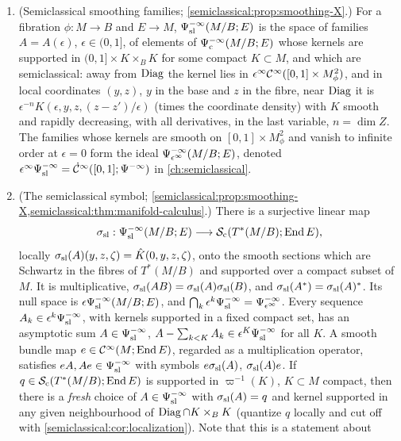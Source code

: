 \begin{enumerate}[label=(S\arabic*),leftmargin=*]
\item\label{scindex:S-smoothing} (Semiclassical smoothing families;
  \cref{semiclassical:prop:smoothing-X}.) For a fibration $\phi:M\to B$ and
  $E\to M$, $\Psi^{-\infty}_{\mathrm{sl}}(M/B;E)$ is the space of families $A=A(\epsilon)$,
  $\epsilon\in(0,1]$, of elements of $\Psi^{-\infty}_{\mathrm c}(M/B;E)$ whose
  kernels are supported in $(0,1]\times K\times_BK$ for some compact
  $K\subset M$, and which are semiclassical: away from $\operatorname{Diag}$ the kernel lies in
  $\epsilon^\infty\mathcal{C}^\infty([0,1]\times M^2_\phi)$, and in local coordinates $(y,z)$,
  $y$ in the base and $z$ in the fibre, near $\operatorname{Diag}$ it is
  $\epsilon^{-n}K(\epsilon,y,z,(z-z')/\epsilon)$ (times the coordinate density)
  with $K$ smooth and rapidly decreasing, with all derivatives, in the last
  variable, $n=\dim Z$. The families whose kernels are smooth on
  $[0,1]\times M^2_\phi$ and vanish to infinite order at $\epsilon=0$ form the
  ideal $\Psi^{-\infty}_{\epsilon^\infty}(M/B;E)$, denoted $\epsilon^\infty\Psi^{-\infty}_{\mathrm{sl}}=
  \dot{\mathcal{C}}^\infty([0,1];\Psi^{-\infty})$ in \cref{ch:semiclassical}.
\item\label{scindex:S-symbol} (The semiclassical symbol;
  \cref{semiclassical:prop:smoothing-X,semiclassical:thm:manifold-calculus}.)
  There is a surjective linear map
  \begin{equation*}
    \sigma_{\mathrm{sl}}:\Psi^{-\infty}_{\mathrm{sl}}(M/B;E)\longrightarrow\mathcal{S}_{\mathrm c}(T^*(M/B);\operatorname{End} E),
  \end{equation*}
  locally $\sigma_{\mathrm{sl}}(A)(y,z,\zeta)=\hat K(0,y,z,\zeta)$, onto the smooth sections
  which are Schwartz in the fibres of $T^*(M/B)$ and supported over a compact
  subset of $M$. It is multiplicative, $\sigma_{\mathrm{sl}}(AB)=\sigma_{\mathrm{sl}}(A)\sigma_{\mathrm{sl}}(B)$, and
  $\sigma_{\mathrm{sl}}(A^*)=\sigma_{\mathrm{sl}}(A)^*$. Its null space is
  $\epsilon\Psi^{-\infty}_{\mathrm{sl}}(M/B;E)$, and
  $\bigcap_k\epsilon^k\Psi^{-\infty}_{\mathrm{sl}}=\Psi^{-\infty}_{\epsilon^\infty}$. Every sequence
  $A_k\in\epsilon^k\Psi^{-\infty}_{\mathrm{sl}}$, with kernels supported in a fixed compact
  set, has an asymptotic sum $A\in\Psi^{-\infty}_{\mathrm{sl}}$,
  $A-\sum_{k<K}A_k\in\epsilon^K\Psi^{-\infty}_{\mathrm{sl}}$ for all $K$. A smooth bundle
  map $e\in\mathcal{C}^\infty(M;\operatorname{End} E)$, regarded as a multiplication operator, satisfies
  $eA,Ae\in\Psi^{-\infty}_{\mathrm{sl}}$ with symbols $e\sigma_{\mathrm{sl}}(A)$, $\sigma_{\mathrm{sl}}(A)e$. If
  $q\in\mathcal{S}_{\mathrm c}(T^*(M/B);\operatorname{End} E)$ is supported in $\varpi^{-1}(K)$, $K\subset M$
  compact, then there is a \emph{fresh} choice of $A\in\Psi^{-\infty}_{\mathrm{sl}}$ with
  $\sigma_{\mathrm{sl}}(A)=q$ and kernel supported in any given neighbourhood of
  $\operatorname{Diag}\cap K\times_BK$ (quantize $q$ locally and cut off with
  \cref{semiclassical:cor:localization}). Note that this is a statement about

\end{enumerate}
